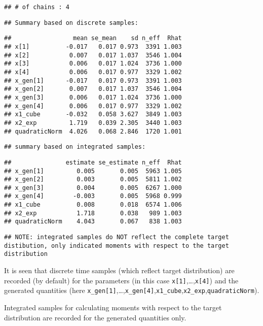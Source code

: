 \documentclass[
]{book}
\begin{document}
\begin{verbatim}
## # of chains : 4
\end{verbatim}

\begin{verbatim}
## Summary based on discrete samples:
\end{verbatim}

\begin{verbatim}
##                 mean se_mean    sd n_eff  Rhat
## x[1]          -0.017   0.017 0.973  3391 1.003
## x[2]           0.007   0.017 1.037  3546 1.004
## x[3]           0.006   0.017 1.024  3736 1.000
## x[4]           0.006   0.017 0.977  3329 1.002
## x_gen[1]      -0.017   0.017 0.973  3391 1.003
## x_gen[2]       0.007   0.017 1.037  3546 1.004
## x_gen[3]       0.006   0.017 1.024  3736 1.000
## x_gen[4]       0.006   0.017 0.977  3329 1.002
## x1_cube       -0.032   0.058 3.627  3849 1.003
## x2_exp         1.719   0.039 2.305  3440 1.003
## quadraticNorm  4.026   0.068 2.846  1720 1.001
\end{verbatim}

\begin{verbatim}
## summary based on integrated samples:
\end{verbatim}

\begin{verbatim}
##               estimate se_estimate n_eff  Rhat
## x_gen[1]         0.005       0.005  5963 1.005
## x_gen[2]         0.003       0.005  5811 1.002
## x_gen[3]         0.004       0.005  6267 1.000
## x_gen[4]        -0.003       0.005  5968 0.999
## x1_cube          0.008       0.018  6574 1.006
## x2_exp           1.718       0.038   989 1.003
## quadraticNorm    4.043       0.067   838 1.003
\end{verbatim}

\begin{verbatim}
## NOTE: integrated samples do NOT reflect the complete target distibution, only indicated moments with respect to the target distribution
\end{verbatim}

It is seen that discrete time samples (which reflect target distribution) are recorded (by default) for the parameters (in this case \texttt{x{[}1{]}},\ldots,\texttt{x{[}4{]}}) and the generated quantities (here \texttt{x\_gen{[}1{]}},\ldots,\texttt{x\_gen{[}4{]}},\texttt{x1\_cube},\texttt{x2\_exp},\texttt{quadraticNorm}).

Integrated samples for calculating moments with respect to the target distribution are recorded for the generated quantities only.
\end{document}

